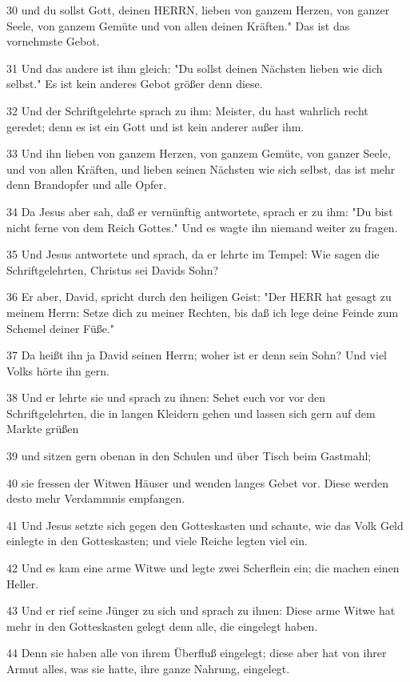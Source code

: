 \par 30 und du sollst Gott, deinen HERRN, lieben von ganzem Herzen, von ganzer Seele, von ganzem Gemüte und von allen deinen Kräften." Das ist das vornehmste Gebot.
\par 31 Und das andere ist ihm gleich: "Du sollst deinen Nächsten lieben wie dich selbst." Es ist kein anderes Gebot größer denn diese.
\par 32 Und der Schriftgelehrte sprach zu ihm: Meister, du hast wahrlich recht geredet; denn es ist ein Gott und ist kein anderer außer ihm.
\par 33 Und ihn lieben von ganzem Herzen, von ganzem Gemüte, von ganzer Seele, und von allen Kräften, und lieben seinen Nächsten wie sich selbst, das ist mehr denn Brandopfer und alle Opfer.
\par 34 Da Jesus aber sah, daß er vernünftig antwortete, sprach er zu ihm: "Du bist nicht ferne von dem Reich Gottes." Und es wagte ihn niemand weiter zu fragen.
\par 35 Und Jesus antwortete und sprach, da er lehrte im Tempel: Wie sagen die Schriftgelehrten, Christus sei Davids Sohn?
\par 36 Er aber, David, spricht durch den heiligen Geist: "Der HERR hat gesagt zu meinem Herrn: Setze dich zu meiner Rechten, bis daß ich lege deine Feinde zum Schemel deiner Füße."
\par 37 Da heißt ihn ja David seinen Herrn; woher ist er denn sein Sohn? Und viel Volks hörte ihn gern.
\par 38 Und er lehrte sie und sprach zu ihnen: Sehet euch vor vor den Schriftgelehrten, die in langen Kleidern gehen und lassen sich gern auf dem Markte grüßen
\par 39 und sitzen gern obenan in den Schulen und über Tisch beim Gastmahl;
\par 40 sie fressen der Witwen Häuser und wenden langes Gebet vor. Diese werden desto mehr Verdammnis empfangen.
\par 41 Und Jesus setzte sich gegen den Gotteskasten und schaute, wie das Volk Geld einlegte in den Gotteskasten; und viele Reiche legten viel ein.
\par 42 Und es kam eine arme Witwe und legte zwei Scherflein ein; die machen einen Heller.
\par 43 Und er rief seine Jünger zu sich und sprach zu ihnen: Diese arme Witwe hat mehr in den Gotteskasten gelegt denn alle, die eingelegt haben.
\par 44 Denn sie haben alle von ihrem Überfluß eingelegt; diese aber hat von ihrer Armut alles, was sie hatte, ihre ganze Nahrung, eingelegt.


